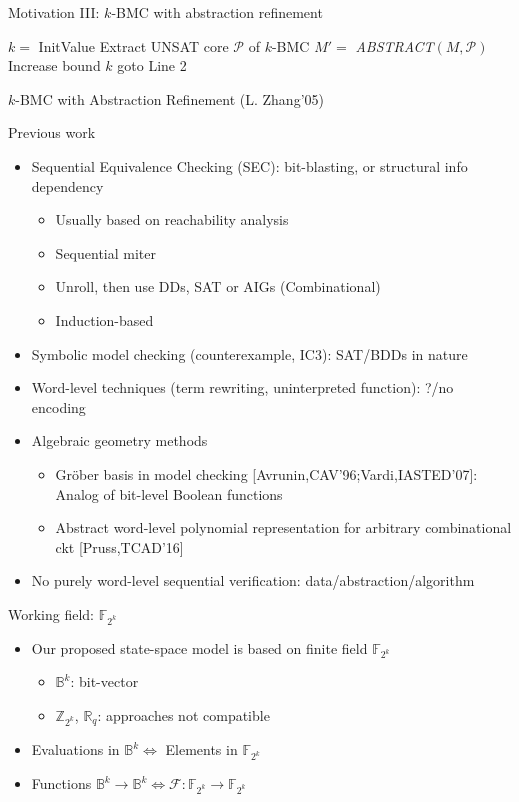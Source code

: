 \documentclass[xcolor=dvipsnames]{beamer}
\newcommand{\Fkk}{{\mathbb{F}}_{2^k}}
\newcommand{\Z}{{\mathbb{Z}}}
\newcommand{\bi}{\begin{itemize}}
\newcommand{\ei}{\end{itemize}}
\newcommand{\Func}{{\mathcal{F}}}
\newcommand{\B}{{\mathbb{B}}}
\newcommand{\R}{{\mathbb{R}}}
\begin{document}
\begin{frame}[label = motiv3]{\large{Motivation III: $k$-BMC with abstraction refinement}}
\IncMargin{1em}
\begin{algorithm}[H]
\SetAlgoNoLine
  $k = $ InitValue\;
  {
  }
  {
	\alert{Extract UNSAT core $\mathcal P$ of $k$-BMC} \;
	$M' = $ \textit{ABSTRACT}$(M,\mathcal P)$\;
  }
  {
  }
  {
	Increase bound $k$\;
	goto Line 2\;
  }
\caption{$k$-BMC with Abstraction Refinement (L. Zhang'05)}
\end{algorithm}
\DecMargin{1em}
\hyperlink{refine}{}
\end{frame}
\begin{frame}{\large{Previous work}}
\bi
\item Sequential Equivalence Checking (SEC): bit-blasting, or structural info dependency
	\bi
	\item Usually based on reachability analysis
	\item Sequential miter
	\item Unroll, then use DDs, SAT or AIGs (Combinational)
	\item Induction-based
	\ei
\item Symbolic model checking (counterexample, IC3): SAT/BDDs in nature
\item Word-level techniques (term rewriting, uninterpreted function): ?/no encoding
\item Algebraic geometry methods
	\bi
	\item Gr\"ober basis in model checking [Avrunin,CAV'96;Vardi,IASTED'07]: Analog of bit-level Boolean functions
	\item Abstract word-level polynomial representation for arbitrary combinational ckt [Pruss,TCAD'16]
	\ei
\pause
\item No purely word-level sequential verification: data/abstraction/algorithm
\ei
\end{frame}
\begin{frame}{\large{Working field: $\Fkk$}}
\bi
\item Our proposed state-space model is based on finite field $\Fkk$
	\bi
	\item $\B^k$: bit-vector
	\item $\Z_{2^k}$, $\R_q$: approaches not compatible
	\ei
\item Evaluations in $\B^k \Leftrightarrow$ Elements in $\Fkk$
\item Functions $\B^k\to\B^k \Leftrightarrow \Func:\Fkk\to\Fkk$
\ei
\end{frame}
\end{document}
